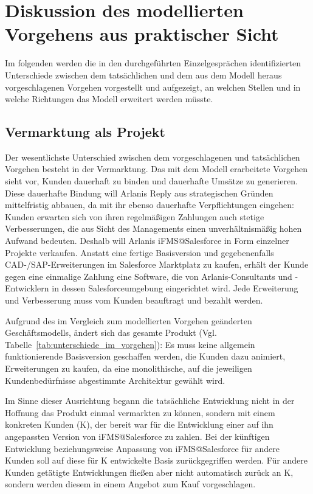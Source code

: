 \section{Diskussion des modellierten Vorgehens aus praktischer Sicht}
\label{cha:diskussion}
\begin{comment}
Im vorletzten Abschnitt diskutieren Sie Ihre Ergebnisse und stellen den Beitrag 
für die Praxis und für die Forschung dar. Gehen Sie auch auf die Einschränkungen 
Ihrer Arbeit ein.
\end{comment}
Im folgenden werden die in den durchgeführten Einzelgesprächen identifizierten 
Unterschiede zwischen dem tatsächlichen und dem aus dem Modell heraus 
vorgeschlagenen Vorgehen vorgestellt und aufgezeigt, an welchen Stellen und in 
welche Richtungen das Modell erweitert werden müsste.

\subsection{Vermarktung als Projekt}
Der wesentlichste Unterschied zwischen dem vorgeschlagenen und 
tatsächlichen Vorgehen besteht in der Vermarktung. Das mit dem Modell 
erarbeitete Vorgehen sieht vor, Kunden dauerhaft zu binden und dauerhafte 
Umsätze zu generieren. Diese dauerhafte Bindung will Arlanis Reply aus 
strategischen Gründen mittelfristig abbauen, da mit ihr ebenso dauerhafte 
Verpflichtungen eingehen: Kunden erwarten sich von ihren regelmäßigen Zahlungen 
auch stetige Verbesserungen, die aus Sicht des Managements einen 
unverhältnismäßig hohen Aufwand bedeuten. Deshalb will Arlanis iFMS@Salesforce 
in Form einzelner Projekte verkaufen. Anstatt eine fertige Basisversion und 
gegebenenfalls CAD-/SAP-Erweiterungen im Salesforce Marktplatz zu kaufen, 
erhält der Kunde gegen eine einmalige Zahlung eine Software, die von 
Arlanis-Consultants und -Entwicklern in dessen Salesforceumgebung eingerichtet 
wird. 
Jede Erweiterung und Verbesserung muss vom Kunden beauftragt und bezahlt werden.

Aufgrund des im Vergleich zum modellierten Vorgehen geänderten 
Geschäftsmodells, ändert sich das gesamte Produkt (Vgl. 
Tabelle~\ref{tab:unterschiede_im_vorgehen}): Es muss keine allgemein 
funktionierende Basisversion geschaffen werden, die Kunden dazu animiert, 
Erweiterungen zu kaufen, da eine monolithische, auf die jeweiligen 
Kundenbedürfnisse abgestimmte Architektur gewählt wird.

Im Sinne dieser Ausrichtung begann die tatsächliche Entwicklung nicht in der 
Hoffnung das Produkt einmal vermarkten zu können, sondern mit einem konkreten 
Kunden (K), der bereit war für die Entwicklung einer auf ihn angepassten 
Version von iFMS@Salesforce zu zahlen. Bei der künftigen Entwicklung 
beziehungsweise Anpassung von iFMS@Salesforce für andere Kunden soll auf diese 
für K entwickelte Basis zurückgegriffen werden. Für andere Kunden getätigte 
Entwicklungen fließen aber nicht automatisch zurück an K, sondern werden diesem 
in einem Angebot zum Kauf vorgeschlagen.

